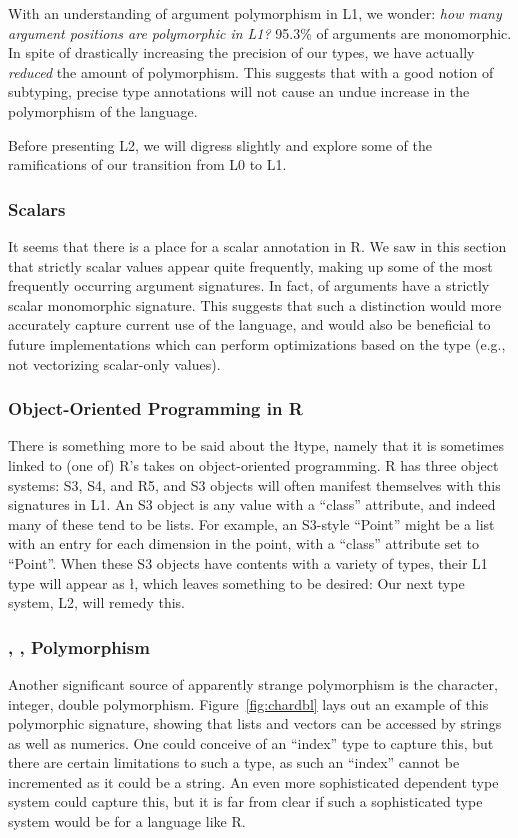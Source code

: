 \documentclass[acmsmall,10pt,review,anonymous]{acmart}\settopmatter{printfolios=true,printccs=false,printacmref=false}
\begin{document}
With an understanding of argument polymorphism in L1, we wonder: {\it how
  many argument positions are polymorphic in L1?}  95.3\% of arguments are
monomorphic.  In spite of drastically increasing the precision of our types,
we have actually {\it reduced} the amount of polymorphism.  This suggests
that with a good notion of subtyping, precise type annotations will not cause
an undue increase in the polymorphism of the language.

Before presenting L2, we will digress slightly and explore some of the ramifications of our transition from L0 to L1.

%
%
\subsubsection{Scalars}\label{sec:scalars}

It seems that there is a place for a scalar annotation in R.  We saw in this
section that strictly scalar values appear quite frequently, making up some
of the most frequently occurring argument signatures.  In fact,
\PERCSCALARMONO of arguments have a strictly scalar monomorphic signature.
This suggests that such a distinction would more accurately capture current
use of the language, and would also be beneficial to future implementations
which can perform optimizations based on the type (e.g., not vectorizing
scalar-only values).

%
%
\subsubsection{Object-Oriented Programming in R}
\label{sec:S3S4R5}

There is something more to be said about the \l type, namely that it is
sometimes linked to (one of) R's takes on object-oriented programming.  R
has three object systems: S3, S4, and R5, and S3 objects will often manifest
themselves with this signatures in L1.  An S3 object is any value with a
``class'' attribute, and indeed many of these tend to be lists.  For
example, an S3-style ``Point'' might be a list with an entry for each
dimension in the point, with a ``class'' attribute set to ``Point''.  When
these S3 objects have contents with a variety of types, their L1 type will
appear as \l, which leaves something to be desired: Our next type system,
L2, will remedy this.

%
%
\subsubsection{\C, \I, \D Polymorphism}
Another significant source of apparently strange polymorphism is the
character, integer, double polymorphism.  Figure~\ref{fig:chardbl} lays out
an example of this polymorphic signature, showing that lists and vectors can
be accessed by strings as well as numerics.  One could conceive of an
``index'' type to capture this, but there are certain limitations to such a
type, as such an ``index'' cannot be incremented as it could be a string.
An even more sophisticated dependent type system could capture this, but
it is far from clear if such a sophisticated type system would be for a
language like R.
\end{document}
